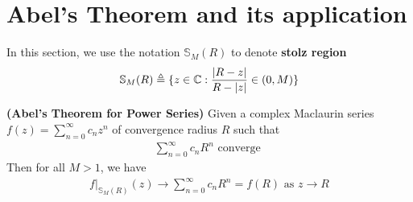 \documentclass{report}
\begin{document}
\section{Abel's Theorem and its application}
\begin{mdframed}
In this section, we use the notation $\mathbb{S}_M(R)$ to denote \textbf{stolz region}
\begin{align*}
\mathbb{S}_M(R)\triangleq \{ z\in\mathbb{C}: \frac{\left|R-z\right|}{R-\left|z\right|}\in (0,M) \}
\end{align*}
\end{mdframed}
\begin{theorem}
\textbf{(Abel's Theorem for Power Series)} Given a complex Maclaurin series $f(z)=\sum_{n=0}^{\infty} c_nz^n$ of convergence radius $R$ such that  
\begin{align*}
\sum_{n=0}^{\infty}c_nR^n\text{ converge }
\end{align*}
Then for all $M>1$, we have  
\begin{align*}
f|_{\mathbb{S}_M(R)}(z)\to \sum_{n=0}^{\infty}c_nR^n=f(R)\text{ as }z\to R 
\end{align*}
\end{theorem}
\end{document}
